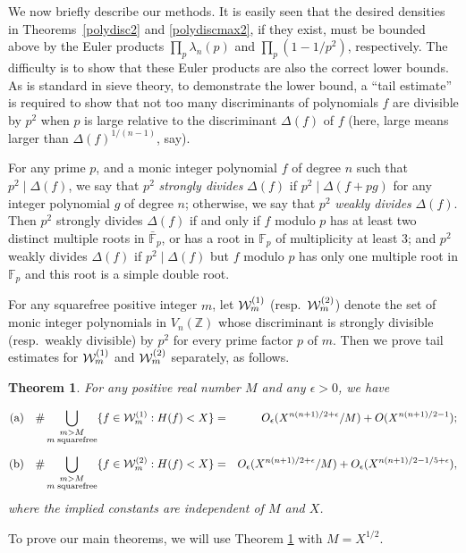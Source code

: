\documentclass[11pt]{article}
\def\Z{{\mathbb Z}}
\def\s{{\rm stab.}}
\def\F{{\mathbb F}}
\def\U{{\mathcal W}}
\def\Vmn{{V_n}}
\def\Z{{\mathbb Z}}
\def\F{{\mathbb F}}
\def\w{{\rm {(2)}}}
\def\s{{\rm {(1)}}}
\newtheorem{theorem}{Theorem}[section]
\begin{document}
\vspace{.1in} We now briefly describe our methods.  It is easily seen
that the desired densities in Theorems~\ref{polydisc2} and
\ref{polydiscmax2}, if they exist, must be bounded above by the Euler
products $\prod_p \lambda_n(p)$ and $\prod_p (1-1/p^2)$,
respectively. The difficulty is to show that these Euler products are
also the correct lower bounds.  As is standard in sieve theory, to
demonstrate the lower bound, a ``tail estimate'' is required to show
that not too many discriminants of polynomials $f$ are divisible by
$p^2$ when $p$ is large relative to the discriminant $\Delta(f)$ of
$f$ (here, large means larger than $\Delta(f)^{1/(n-1)}$, say).

For any prime $p$, and a monic integer polynomial $f$ of degree $n$
such that $p^2\mid \Delta(f)$, we say that $p^2$ {\it strongly
  divides} $\Delta(f)$ if $p^2\mid \Delta(f + pg)$ for any integer
polynomial $g$ of degree $n$; otherwise, we say that $p^2$ {\it weakly
  divides} $\Delta(f)$. Then $p^2$ strongly divides $\Delta(f)$ if and
only if $f$ modulo $p$ has at least two distinct multiple roots in
$\bar{\F}_p$, or has a root in $\F_p$ of multiplicity at least 3; and
$p^2$ weakly divides $\Delta(f)$ if $p^2\mid \Delta(f)$ but $f$ modulo
$p$ has only one multiple root in $\F_p$ and this root is a simple
double root.

For any squarefree positive integer $m$, let $\U_m^\s$
(resp.\ $\U_m^\w$) denote the set of monic integer polynomials in
$\Vmn(\Z)$ whose discriminant is strongly divisible (resp.\ weakly
divisible) by $p^2$ for every prime factor $p$ of $m$.  Then we prove
tail estimates for $\U_m^\s$ and $\U_m^\w$ separately, as follows.

\begin{theorem}\label{thm:mainestimate}
For any positive real number $M$ and any $\epsilon>0$, we have

\vspace{-5pt}\begin{eqnarray*}
\label{eq:equs}
{\rm (a)}\quad \#\bigcup_{\substack{m>M\\ m\;\mathrm{ squarefree}
 }}\{f\in\U_m^\s:H(f)<X\}&=&
O_\epsilon(X^{n(n+1)/2+\epsilon}/M)+O(X^{n(n+1)/2-1});\\[.075in]
\label{equ1}
{\rm (b)}\quad
\#\bigcup_{\substack{m>M\\
m\;\mathrm{ squarefree}
}}\{f\in\U_m^\w:H(f)<X\}&=&
O_\epsilon(X^{n(n+1)/2+\epsilon}/M)+O_\epsilon(X^{n(n+1)/2-1/5+\epsilon}),
\end{eqnarray*}
where the implied constants are independent of $M$ and $X$.
\end{theorem}
\noindent To prove our main theorems, we will use Theorem
\ref{thm:mainestimate} with $M=X^{1/2}$.
\end{document}
